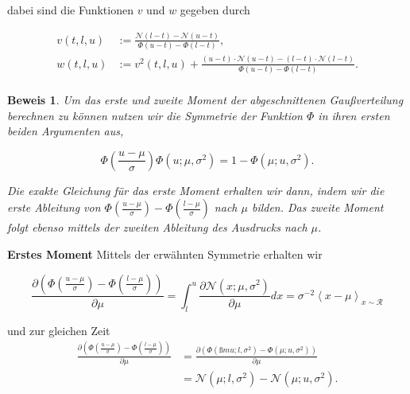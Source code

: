 \documentclass[12pt,a4paper]{scrartcl}
\newtheorem{Beweis}{Beweis}
\numberwithin{equation}{section}
\begin{document}
 dabei sind die Funktionen $v$ und $w$ gegeben durch
 
 \begin{equation}
  \begin{split}
    v(t,l,u) &:= \frac{ \mathcal{N}(l-t) - \mathcal{N}(u-t) }{ \Phi(u-t) - \Phi(l-t)}, \\
    w(t,l,u) &:= v^2(t,l,u) + \frac{(u-t) \cdot \mathcal{N}(u-t) - (l-t) \cdot \mathcal{N}(l-t)}{\Phi(u-t) - \Phi(l-t)}. \\
  \end{split}
 \end{equation}

 \begin{Beweis}
  Um das erste und zweite Moment der abgeschnittenen Gaußverteilung berechnen zu können nutzen wir die Symmetrie
   der Funktion $\Phi$ in ihren ersten beiden Argumenten aus, 
   
   \begin{equation}
    \Phi \left(\frac{u - \mu}{\sigma} \right) \Phi(u; \mu,\sigma^2) = 1 - \Phi(\mu; u, \sigma^2).
   \end{equation}

   Die exakte Gleichung für das erste Moment erhalten wir dann, indem wir die erste Ableitung von 
   $\Phi \left( \frac{u- \mu}{\sigma} \right) - \Phi \left( \frac{l- \mu}{\sigma} \right)$ nach $\mu$ bilden. 
   Das zweite Moment folgt ebenso mittels der zweiten Ableitung des Ausdrucks nach $\mu$. 
 \end{Beweis}

\textbf{Erstes Moment	} Mittels der erwähnten Symmetrie erhalten wir 

\begin{equation}
 \frac{ \partial \left( \Phi \left( \frac{u - \mu}{\sigma}\right) - \Phi \left( \frac{l - \mu}{\sigma}\right) \right) }{ \partial \mu} = \int_l^u \frac{ \partial \mathcal{N}(x; \mu, \sigma^2)}{\partial \mu} dx = \sigma^{-2} \left< x -\mu \right>_{x \sim \mathcal{R}}
\end{equation}

und zur gleichen Zeit
\begin{equation}
 \begin{split}
 \frac{ \partial \left( \Phi \left( \frac{u - \mu}{\sigma}\right) - \Phi \left( \frac{l - \mu}{\sigma}\right) \right) }{ \partial \mu} &= \frac{ \partial (\Phi(ßmu; l, \sigma^2) - \Phi(\mu;u,\sigma^2))}{ \partial \mu} \\ 
 &= \mathcal{N}(\mu; l, \sigma^2) - \mathcal{N}(\mu; u, \sigma^2). \\
 \end{split}
 \end{equation}
\end{document}
